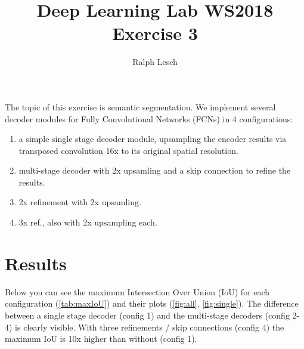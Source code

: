 \documentclass[11pt,a4paper,DIV=14,headinclude=false,footinclude=false]{scrartcl}
\begin{document}
\title{Deep Learning Lab WS2018\\Exercise 3}
\author{Ralph Lesch}
\maketitle

\noindent The topic of this exercise is semantic segmentation. We implement several decoder modules for Fully Convolutional Networks (FCNs) in 4 configurations:
\begin{enumerate}
\item a simple single stage decoder module, upsampling the encoder results via transposed convolution 16x to its original spatial resolution.
\item multi-stage decoder with 2x upsamling and a skip connection to refine the results.
\item 2x refinement with 2x upsamling.
\item 3x ref., also with 2x upsampling each.
\end{enumerate}
\section{Results}
Below you can see the maximum Intersection Over Union (IoU) for each configuration (\autoref{tab:maxIoU}) and their plots (\autoref{fig:all}, \ref{fig:single}). The difference between a single stage decoder (config 1) and the multi-stage decoders (config 2-4) is clearly visible. With three refinements / skip connections (config 4) the maximum IoU is 10x higher than without (config 1).
\end{document}
